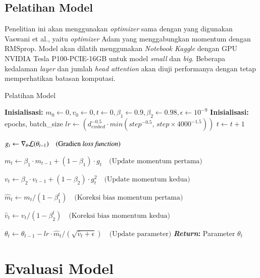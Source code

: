    \subsection{Pelatihan Model}
    Penelitian ini akan menggunakan \textit{optimizer} sama dengan yang digunakan Vaswani et al., yaitu \textit{optimizer} Adam \cite{ahn2024understandingadamoptimizeronline} yang menggabungkan momentum dengan RMSprop. Model akan dilatih menggunakan \textit{Notebook Kaggle} dengan GPU NVIDIA Tesla P100-PCIE-16GB untuk model \textit{small} dan \textit{big}. Beberapa kedalaman \textit{layer} dan jumlah \textit{head attention} akan diuji performanya dengan tetap memperhatikan batasan komputasi.
\begin{algorithm}[H]
    \caption{Pelatihan Model}
    \begin{algorithmic}[1]
        \State \textbf{Inisialisasi:} $m_0 \gets 0, v_0 \gets 0, t \gets 0, \beta_1 \gets 0.9, \beta_2 \gets 0.98, \epsilon \gets 10^{-9}$
        \State \textbf{Inisialisasi:} epochs, batch\_size
                \State $lr \gets (d_{embed}^{-0.5} \cdot min(step^{-0.5}, \, step \times    4000^{-1.5}))$
                \State $t \gets t + 1$
                
                \State $g_t \gets \nabla_\theta \mathcal{L}(\theta_{t-1}) \quad \text{(Gradien  \textit{loss function})}$
                
                \State $m_t \gets \beta_1 \cdot m_{t-1} + (1 - \beta_1) \cdot g_t \quad     \text{(Update momentum pertama)}$
                
                \State $v_t \gets \beta_2 \cdot v_{t-1} + (1 - \beta_2) \cdot g_t^2 \quad   \text{(Update momentum kedua)}$
                
                \State $\hat{m}_t \gets m_t / (1 - \beta_1^t) \quad \text{(Koreksi bias     momentum pertama)}$
    
                \State $\hat{v}_t \gets v_t / (1 - \beta_2^t) \quad \text{(Koreksi bias     momentum kedua)}$
    
                \State $\theta_{t} \gets \theta_{t-1} - lr \cdot \hat{m}_t / (\sqrt{\hat{v}_t +     \epsilon}) \quad \text{(Update parameter)}$
            \EndWhile
        \EndWhile
        \State \textbf{\textit{Return}:} Parameter $\theta_t$
    \end{algorithmic}
\end{algorithm}


\section{Evaluasi Model}
